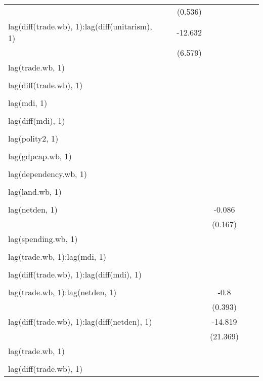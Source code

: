 \begin{tabular}{l*{5}{c}}
  		& 		&(0.536) 		& 		& 		& \\
lag(diff(trade.wb), 1):lag(diff(unitarism), 1) 		& 		&-12.632\sym{*} 		& 		& 		& \\
  		& 		&(6.579) 		& 		& 		& \\
lag(trade.wb, 1) 		& 		& 		& 		& 		& \\
  		& 		& 		& 		& 		& \\
lag(diff(trade.wb), 1) 		& 		& 		& 		& 		& \\
  		& 		& 		& 		& 		& \\
lag(mdi, 1) 		& 		& 		& 		& 		& \\
  		& 		& 		& 		& 		& \\
lag(diff(mdi), 1) 		& 		& 		& 		& 		& \\
  		& 		& 		& 		& 		& \\
lag(polity2, 1) 		& 		& 		& 		& 		& \\
  		& 		& 		& 		& 		& \\
lag(gdpcap.wb, 1) 		& 		& 		& 		& 		& \\
  		& 		& 		& 		& 		& \\
lag(dependency.wb, 1) 		& 		& 		& 		& 		& \\
  		& 		& 		& 		& 		& \\
lag(land.wb, 1) 		& 		& 		& 		& 		& \\
  		& 		& 		& 		& 		& \\
lag(netden, 1) 		& 		& 		&-0.086 		& 		& \\
  		& 		& 		&(0.167) 		& 		& \\
lag(spending.wb, 1) 		& 		& 		& 		& 		& \\
  		& 		& 		& 		& 		& \\
lag(trade.wb, 1):lag(mdi, 1) 		& 		& 		& 		& 		& \\
  		& 		& 		& 		& 		& \\
lag(diff(trade.wb), 1):lag(diff(mdi), 1) 		& 		& 		& 		& 		& \\
  		& 		& 		& 		& 		& \\
lag(trade.wb, 1):lag(netden, 1) 		& 		& 		&-0.8\sym{**} 		& 		& \\
  		& 		& 		&(0.393) 		& 		& \\
lag(diff(trade.wb), 1):lag(diff(netden), 1) 		& 		& 		&-14.819 		& 		& \\
  		& 		& 		&(21.369) 		& 		& \\
lag(trade.wb, 1) 		& 		& 		& 		& 		& \\
  		& 		& 		& 		& 		& \\
lag(diff(trade.wb), 1) 		& 		& 		& 		& 		& \\

\end{tabular}
